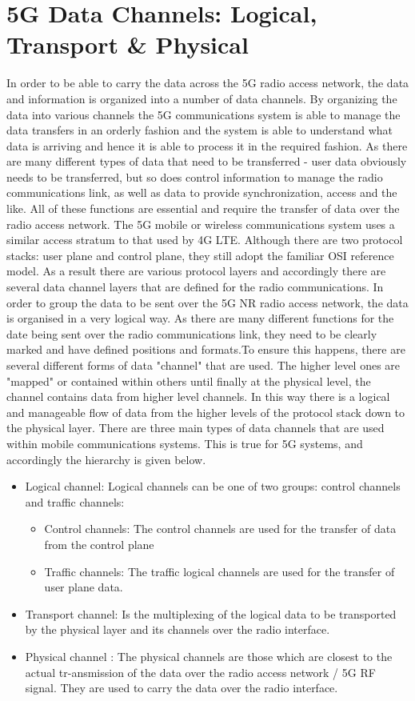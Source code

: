 \section{5G Data Channels: Logical, Transport \& Physical}

In order to be able to carry the data across the 5G radio access network, the data and information is organized into a number of data channels.
By organizing the data into various channels the 5G communications system is able to manage the data transfers in an orderly fashion and the system is able to understand what data is arriving and hence it is able to process it in the required fashion.
As there are many different types of data that need to be transferred - user data obviously needs to be transferred, but so does control information to manage the radio communications link, as well as data to provide synchronization, access and the like. All of these functions are essential and require the transfer of data over the radio access network. The 5G mobile or wireless communications system uses a similar access stratum to that used by 4G LTE.
Although there are two protocol stacks: user plane and control plane, they still adopt the familiar OSI reference model.
As a result there are various protocol layers and accordingly there are several data channel layers that are defined for the radio communications.
In order to group the data to be sent over the 5G NR radio access network, the data is organised in a very logical way. As there are many different functions for the date being sent over the radio communications link, they need to be clearly marked and have defined positions and formats.To ensure this happens, there are several different forms of data "channel" that are used. The higher level ones are "mapped" or contained within others until finally at the physical level, the channel contains data from higher level channels.
In this way there is a logical and manageable flow of data from the higher levels of the protocol stack down to the physical layer.
There are three main types of data channels that are used within mobile communications systems. This is true for 5G systems, and accordingly the hierarchy is given below.
\begin{itemize}
    \item Logical channel: Logical channels can be one of two groups: control channels and traffic channels:
    \begin{itemize}
        \item Control channels: The control channels are used for the transfer of data from the control plane
        \item Traffic channels: The traffic logical channels are used for the transfer of user plane data.
        \end{itemize}
    \item Transport channel: Is the multiplexing of the logical data to be transported by the physical layer and its channels over the radio interface.
    \item Physical channel : The physical channels are those which are closest to the actual tr-ansmission of the data over the radio access network / 5G RF signal. They are used to carry the data over the radio interface.
\end{itemize}
